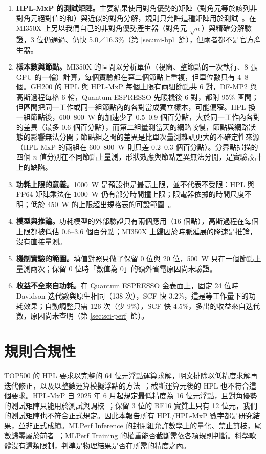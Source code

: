 \begin{enumerate}
  \item \textbf{HPL-MxP 的測試矩陣。}主要結果使用對角優勢的矩陣（對角元等於該列非對角元絕對值的和）與近似的對角分解，規則只允許這種矩陣用於測試~\cite{HPLMxPRules}。在 MI350X 上另以我們自己的非對角優勢產生器（對角元 $\sqrt n$）與精確分解驗證，3 位仍通過、仍快 5.0／16.3\%（第 \ref{sec:mi-hpl} 節），但兩者都不是官方產生器。
  \item \textbf{樣本數與節點。}MI350X 的區間以分析單位（視窗、整節點的一次執行、8 張 GPU 的一輪）計算，每個實驗都在第二個節點上重複，但單位數只有 4–8 個。GH200 的 HPL 與 HPL-MxP 每個上限有兩組節點共 6 對，DF-MP2 與高斯過程每格 6 輪，Quantum ESPRESSO 先暖機後 6 對，都附 95\% 區間；但區間把同一工作或同一組節點內的各對當成獨立樣本，可能偏窄。HPL 換一組節點後，600–800~W 的加速少了 0.5–0.9 個百分點，大於同一工作內各對的差異（最多 0.6 個百分點），而第二組量測當天的網路較慢，節點與網路狀態的影響無法分開；節點組之間的差異是比單次量測雜訊更大的不確定性來源（HPL-MxP 的兩組在 600–800~W 則只差 0.2–0.3 個百分點）。分界點掃描的四個 $n$ 值分別在不同節點上量測，形狀效應與節點差異無法分開，是實驗設計上的缺陷。
  \item \textbf{功耗上限的意義。}1000~W 是預設也是最高上限，並不代表不受限：HPL 與 FP64 矩陣乘法在 1000~W 仍有部分時間撞上限；限電器依據的時間尺度不明；低於 450~W 的上限超出規格表的可設範圍~\cite{NVIDIAGH200}。
  \item \textbf{模型與推論。}功耗模型的外部驗證只有兩個應用（16 個點），高斯過程在每個上限都被低估 0.6–3.6 個百分點；MI350X 上歸因於時脈延展的降速是推論，沒有直接量測。
  \item \textbf{機制實驗的範圍。}填值對照只做了保留 0 位與 20 位，500~W 只在一個節點上量測兩次；保留 0 位時「數值為 0」的額外省電原因尚未驗證。
  \item \textbf{收益不全來自功耗。}在 Quantum ESPRESSO 金表面上，固定 24 位時 Davidson 迭代數與原生相同（138 次），SCF 快 3.2\%，這是等工作量下的功耗效果；自動調整只需 126 次（少 9\%），SCF 快 4.5\%，多出的收益來自迭代數，原因尚未查明（第 \ref{sec:sci-perf} 節）。
\end{enumerate}

\section{規則合規性}\label{sec:rules}

\enlargethispage{2\baselineskip}
TOP500 的 HPL 要求以完整的 64 位元浮點運算求解，明文排除以低精度求解再迭代修正，以及以整數運算模擬浮點的方法~\cite{TOP500Linpack}；截斷運算元後的 HPL 也不符合這個要求。HPL-MxP 自 2025 年 6 月起規定最低精度為 16 位元浮點，且對角優勢的測試矩陣只能用於測試與調校~\cite{HPLMxPRules}；保留 3 位的 BF16 實質上只有 12 位元，我們的測試矩陣也不符合正式規定。因此本報告所有 HPL/HPL-MxP 數字都是研究結果，並非正式成績。MLPerf Inference 的封閉組允許數學上的量化、禁止剪枝，尾數歸零屬於前者~\cite{MLPerfInfRules}；MLPerf Training 的權重能否截斷需依各項規則判斷。科學軟體沒有這類限制，判準是物理結果是否在所需的精度之內。
